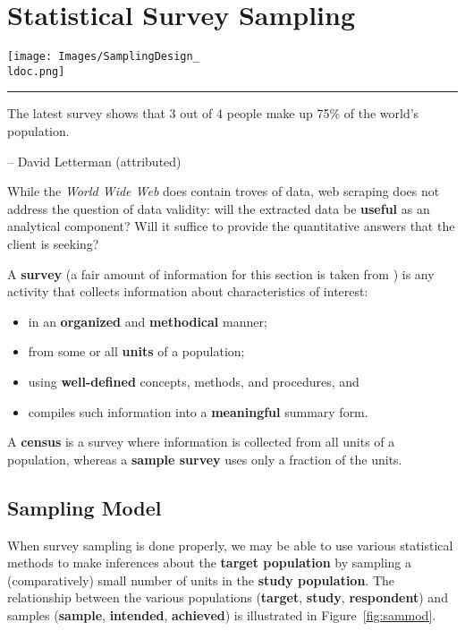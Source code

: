 \newpage
\section{Statistical Survey Sampling}
\begin{figure*}[t]
\centering
\texttt{[image: Images/SamplingDesign\_\\ldoc.png]}
\caption[\small The sampling model]{\small Various populations and samples in the sampling model.} \hrule\label{fig:sammod}
\end{figure*}

\begin{tcolorbox}[title=You Can't Say It's Not True]
The latest survey shows that 3 out of 4 people make up 75\% of the world's population.\\[-0.6cm]
\begin{flushright}
-- David Letterman (attributed)
\end{flushright}
\end{tcolorbox}
\noindent
While the \textit{World Wide Web} does contain troves of data, web scraping does not address the question of data validity: will the extracted data be \textbf{useful} as an analytical component? Will it  suffice to provide the quantitative answers that the client is seeking? 

A \textbf{survey} (a fair amount of information for this section is taken from \cite{DC_F,DC_SC}) is any activity that collects information about characteristics of interest:
\begin{itemize}[noitemsep] 
\item in an \textbf{organized} and \textbf{methodical} manner;
\item from some or all \textbf{units} of a population;
\item using \textbf{well-defined} concepts, methods, and procedures, and
\item compiles such information into a \textbf{meaningful} summary form. 
\end{itemize}
A \textbf{census} is a survey where information is collected from all units of a population, whereas a \textbf{sample survey} uses only a fraction of the units. 
\subsection{Sampling Model}
When survey sampling is done properly, we may be able to use various statistical methods to make inferences about the \textbf{target population} by sampling a (comparatively) small number of units in the \textbf{study population}. The relationship between the various populations (\textbf{target}, \textbf{study}, \textbf{respondent}) and samples (\textbf{sample}, \textbf{intended}, \textbf{achieved}) is illustrated in Figure~\ref{fig:sammod}. 
